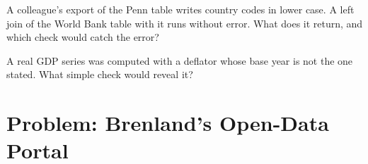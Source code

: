 \begin{exercise}[$\star\star\star$]\label{exo:b1:economic-data-python:silent}
A colleague's export of the Penn table writes country codes in lower
case. A left join of the World Bank table with it runs without error. What
does it return, and which check would catch the error?
\end{exercise}

\begin{exercise}[$\star\star\star$]\label{exo:b1:economic-data-python:base}
A real GDP series was computed with a deflator whose base year is not the
one stated. What simple check would reveal it?
\end{exercise}

\section{Problem: Brenland's Open-Data Portal}\label{sec:b1:economic-data-python:problem}

